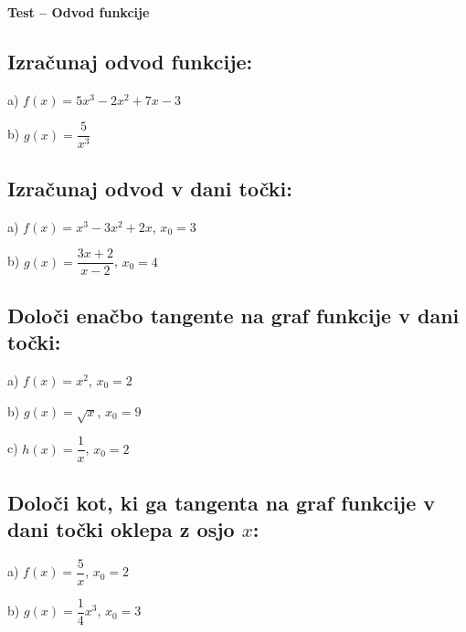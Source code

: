 \documentclass[a4paper,12pt]{article}
\begin{document}
\pagestyle{fancy}
\lhead{}\chead{}\rhead{}

\begin{center}
\Huge {\textbf{Test – Odvod funkcije}}
\end{center}

\subsection{ Izračunaj odvod funkcije:}

a) $f(x)=5x^3-2x^2+7x-3$

b) $g(x)=\dfrac{5}{x^3}$

\vspace{1cm}

\subsection{ Izračunaj odvod v dani točki:}

a) $f(x)=x^3-3x^2+2x$, \quad $x_0=3$

b) $g(x)=\dfrac{3x+2}{x-2}$, \quad $x_0=4$

\vspace{1cm}

\subsection{ Določi enačbo tangente na graf funkcije v dani točki:}

a) $f(x)=x^2$, \quad $x_0=2$

b) $g(x)=\sqrt{x}$, \quad $x_0=9$

c) $h(x)=\dfrac{1}{x}$, \quad $x_0=2$

\vspace{1cm}

\subsection{Določi kot, ki ga tangenta na graf funkcije v dani točki oklepa z osjo $x$:}

a) $f(x)=\dfrac{5}{x}$, \quad $x_0=2$

b) $g(x)=\dfrac{1}{4}x^3$, \quad $x_0=3$

\vspace{1cm}

\end{document}
